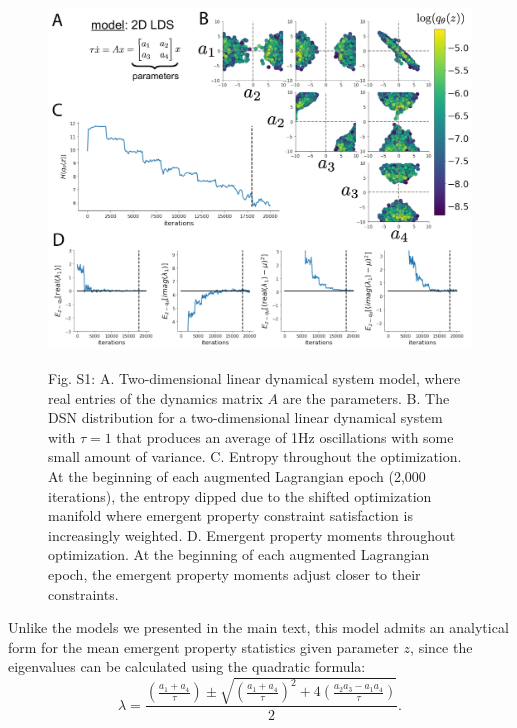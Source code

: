 \documentclass[11pt]{article}
\begin{document}
\begin{figure}
\begin{center}
\includegraphics[scale=0.5]{figures/figS2/figS2.pdf}
\end{center}
\begin{flushleft}
Fig. S1: A. Two-dimensional linear dynamical system model, where real entries of the dynamics matrix $A$ are the parameters.  B. The DSN distribution for a two-dimensional linear dynamical system  with $\tau=1$ that produces an average of 1Hz oscillations with some small amount of variance.  C. Entropy throughout the optimization.  At the beginning of each augmented Lagrangian epoch (2,000 iterations), the entropy dipped due to the shifted optimization manifold where emergent property constraint satisfaction is increasingly weighted.  D. Emergent property moments throughout optimization.  At the beginning of each augmented Lagrangian epoch, the emergent property moments adjust closer to their constraints.
\end{flushleft}
\end{figure}

Unlike the models we presented in the main text, this model admits an analytical form for the mean emergent property statistics given parameter $z$, since the eigenvalues can be calculated using the quadratic formula: 
\begin{equation}
\lambda = \frac{(\frac{a_1 + a_4}{\tau}) \pm \sqrt{(\frac{a_1+a_4}{\tau})^2 + 4(\frac{a_2 a_3 - a_1 a_4}{\tau})}}{2}.
\end{equation}
\end{document}
